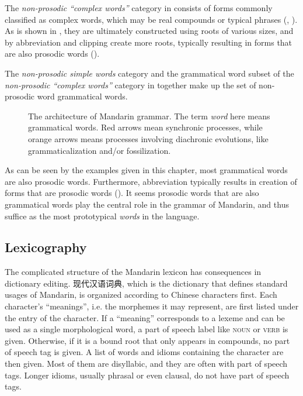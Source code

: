 \documentclass[UTF8, a4paper, oneside, scheme=plain, 12pt]{ctexrep}
\newcommand*{\term}[1]{\emph{#1}}
\newcommand*{\category}[1]{\textsc{#1}}
\begin{document}
The \term{non-prosodic ``complex words''} category in 
consists of forms commonly classified as complex words,
which may be real compounds or typical phrases 
(, ).
As is shown in ,
they are ultimately constructed using roots of various sizes,
and by abbreviation and clipping create more roots,
typically resulting in forms that are also prosodic words
().

The \term{non-prosodic simple words} category 
and the grammatical word subset of the \term{non-prosodic ``complex words''} category
in 
together make up the set of non-prosodic word grammatical words.

\begin{figure}[H]
    \centering
    
    \caption{The architecture of Mandarin grammar. The term \term{word} here means grammatical words.
    Red arrows mean synchronic processes,
    while orange arrows means processes involving diachronic evolutions,
    like grammaticalization and/or fossilization.}
    \label{fig:grammar-architecture}
\end{figure}

As can be seen by the examples given in this chapter,
most grammatical words are also prosodic words.
Furthermore, abbreviation typically results in creation of forms that are prosodic words
().
It seems prosodic words that are also grammatical words play the central role 
in the grammar of Mandarin,
and thus suffice as the most prototypical \term{words} in the language.

\subsection{Lexicography}

The complicated structure of the Mandarin lexicon has consequences in dictionary editing.
现代汉语词典, which is the dictionary that defines standard usages of Mandarin,
is organized according to Chinese characters first.
Each character's ``meanings'',
i.e. the morphemes it may represent,
are first listed under the entry of the character.
If a ``meaning'' corresponds to a lexeme and can be used as a single morphological word,
a part of speech label like \category{noun} or \category{verb} is given.
Otherwise, if it is a bound root that only appears in compounds,
no part of speech tag is given.
A list of words and idioms containing the character are then given.
Most of them are disyllabic, and they are often with part of speech tags.
Longer idioms, usually phrasal or even clausal,
do not have part of speech tags.
\end{document}

